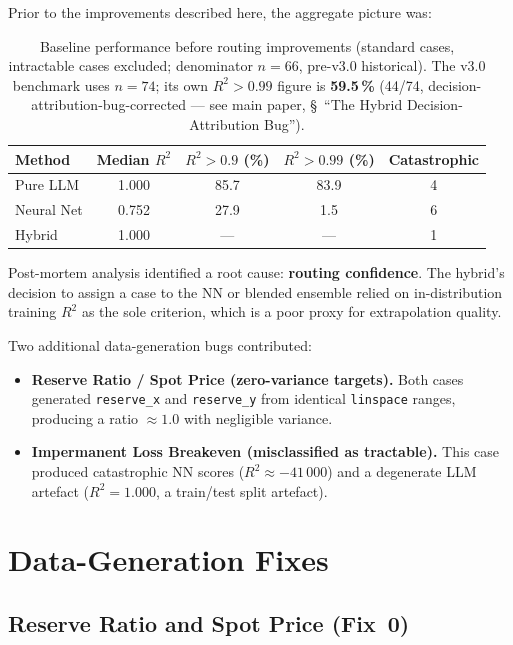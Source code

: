 \documentclass[twoside,11pt]{article}
\begin{document}
Prior to the improvements described here, the aggregate picture was:

\begin{table}[h]
\centering
\caption{Baseline performance before routing improvements (standard cases,
         intractable cases excluded; denominator $n{=}66$, pre-v3.0 historical). The v3.0
         benchmark uses $n=74$; its own $R^2>0.99$ figure is \textbf{59.5\,\%} (44/74,
         decision-attribution-bug-corrected --- see main paper, \S~``The Hybrid
         Decision-Attribution Bug'').}
\label{tab:baseline}
\begin{tabular}{lcccc}
\toprule
Method & Median $R^2$ & $R^2 > 0.9$ (\%) & $R^2 > 0.99$ (\%) & Catastrophic \\
\midrule
Pure LLM    & 1.000 & 85.7 & 83.9 & 4 \\
Neural Net  & 0.752 & 27.9 &  1.5 & 6 \\
Hybrid      & 1.000 & --- & --- & 1 \\
\bottomrule
\end{tabular}
\end{table}

Post-mortem analysis identified a root cause: \textbf{routing confidence}. The hybrid's decision
to assign a case to the NN or blended ensemble relied on in-distribution
training $R^2$ as the sole criterion, which is a poor proxy for
extrapolation quality.

Two additional data-generation bugs contributed:

\begin{itemize}[leftmargin=*]
  \item \textbf{Reserve Ratio / Spot Price (zero-variance targets).}
    Both cases generated \texttt{reserve\_x} and \texttt{reserve\_y} from
    identical \texttt{linspace} ranges, producing a ratio $\approx 1.0$ with
    negligible variance.
  \item \textbf{Impermanent Loss Breakeven (misclassified as tractable).}
    This case produced catastrophic NN scores ($R^2 \approx -41\,000$) and a
    degenerate LLM artefact ($R^2 = 1.000$, a train/test split artefact).
\end{itemize}

\section{Data-Generation Fixes}
\label{sec:data_fixes}

\subsection{Reserve Ratio and Spot Price (Fix~0)}
\end{document}
